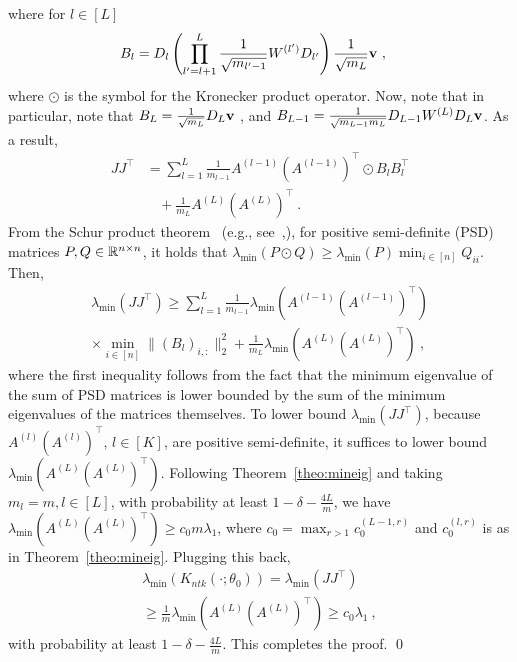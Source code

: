 where for $l \in [L]$
\begin{align}
B_l & =  D_l \left( \prod_{l'=l+1}^L \frac{1}{\sqrt{m_{l'-1}}}  W^{(l')} D_{l'} \right) \frac{1}{\sqrt{m_L}} \mathbf{v} ~,
\end{align}
where $\odot$ is the symbol for the Kronecker product operator. Now, note that in particular, note that 
$B_L = \frac{1}{\sqrt{m_{L}}} D_L  \mathbf{v}~$,
and
$B_{L-1} = \frac{1}{\sqrt{m_{L-1} m_{L}}} D_{L-1} W^{(L)} D_L \mathbf{v}$. 
As a result, 
\begin{align*}
JJ^\top & = \sum_{l=1}^L \frac{1}{m_{l-1}} A^{(l-1)} (A^{(l-1)})^\top \odot B_l B_l^\top\\
&~~~~+ \frac{1}{m_L} A^{(L)} (A^{(L)})^\top~.
\end{align*}
From the Schur product theorem~ (e.g., see~\cite[Lemma 6.5]{oymak2020hermite},\cite[Theorem~3.2]{QN-PB-MM:21}), for positive semi-definite (PSD) matrices $P,Q \in \mathbb{R}^{n \times n}$, it holds that $\lambda_{\min}(P \odot Q) \geq \lambda_{\min}(P) \min_{i \in [n]} Q_{ii}$. Then,
\begin{multline*}
\lambda_{\min}(JJ^\top) \geq \sum_{l=1}^L \frac{1}{m_{l-1}} \lambda_{\min}\left(A^{(l-1)} (A^{(l-1)})^\top\right)\\
\times\min_{i \in [n]} \| (B_l)_{i,:}\|_2^2 + \frac{1}{m_L} \lambda_{\min}\left(A^{(L)} (A^{(L)})^\top\right)~,
\end{multline*}
where the first inequality follows from the fact that the minimum eigenvalue of the sum of PSD matrices is lower bounded by the sum of the minimum eigenvalues of the matrices themselves. To lower bound $\lambda_{\min}(JJ^\top)$, because $A^{(l)} (A^{(l)})^\top$, $l\in[K]$, are positive semi-definite, it suffices to lower bound $\lambda_{\min}\left(A^{(L)} (A^{(L)})^\top\right)$. Following Theorem~\ref{theo:mineig} and taking $m_l = m, l \in [L]$, with probability at least $1-\delta - \frac{4L}{m}$, we have $\lambda_{\min}\left(A^{(L)} (A^{(L)})^\top\right) \geq c_0 m \lambda_1$, where $c_0 = \max_{r > 1} c_0^{(L-1,r)}$ and $c_0^{(l,r)}$ is as in Theorem~\ref{theo:mineig}. Plugging this back,
\begin{multline*}
\lambda_{\min}(K_{ntk}(\cdot ;\theta_0)) = \lambda_{\min}(JJ^\top)\\\geq \frac{1}{m} \lambda_{\min}\left(A^{(L)} (A^{(L)})^\top\right)\geq c_0 \lambda_1~,
\end{multline*}
with probability at least $1-\delta - \frac{4L}{m}$. This completes the proof. \qed




























